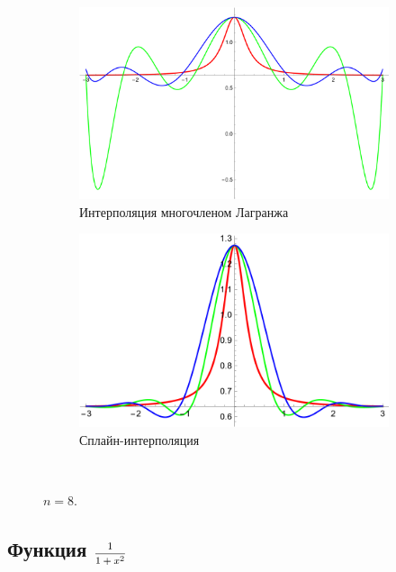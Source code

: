 \documentclass[12pt, a4paper]{article}
\begin{document}
	\begin{figure}[H]
		\centering
		\begin{subfigure}{0.4\textwidth}
			\includegraphics[width=\textwidth]{3_l8}
			\caption{Интерполяция многочленом Лагранжа}
		\end{subfigure}
		\hfill
		\begin{subfigure}{0.4\textwidth}
			\includegraphics[width=\textwidth]{3_s8}
			\caption{Сплайн-интерполяция}
		\end{subfigure}
		\hfill
		\\[0.5cm]
		\caption{$n = 8$.}
		\label{fig:figures}
	\end{figure}
	
	
	\subsection{Функция $\hbox{\footnotesize$\displaystyle\frac{1}{1+x^2}$}$}
	
\end{document}
